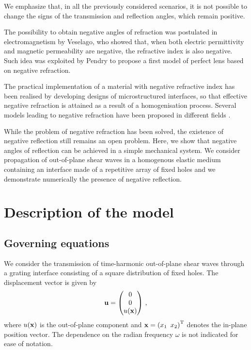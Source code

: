 \documentclass[10p]{article}
\begin{document}
We emphasize that, in all the previously considered scenarios, it is not possible to change the signs of the transmission and reflection angles, which remain positive.  

The possibility to obtain negative angles of refraction was postulated in electromagnetism by Veselago\cite{Veselago1968}, who showed that, when both electric permittivity and magnetic permeability are negative, the refractive index is also negative. Such idea was exploited by Pendry\cite{Pendry2000} to propose a first model of perfect lens based on negative refraction. 

The practical implementation of a material with negative refractive index has been realised by developing designs of microstructured interfaces, so that effective negative refraction is attained as a result of a homogenisation process\cite{Smith2000}. Several models leading to negative refraction have been proposed in different fields \cite{Bigoni2013,Colquitt2011,Farhat2008,HladkyHennion2008,Borfiga2019,Morini2019,Chen2022}.


While the problem of negative refraction has been solved, the existence of negative reflection still remains an open problem.
Here, we show that negative angles of reflection can be achieved in a simple mechanical system. We consider propagation of out-of-plane shear waves in a homogenous elastic medium containing an interface made of a repetitive array of fixed holes and we demonstrate numerically the presence of negative reflection.



\section{\label{Sect1}Description of the model}

\subsection{Governing equations}
\label{Sect1.1}

We consider the transmission of time-harmonic out-of-plane shear waves through a grating interface consisting of a square distribution of fixed holes. The displacement vector is given by
\begin{equation}
\label{eqn001}
{\bf u}=
\begin{pmatrix}
0\\
0\\
u({\bf x})
\end{pmatrix}\,,
\end{equation}
where $u({\bf x})$ is the out-of-plane component and ${\bf x}={(x_1\,\,\, x_2)}^{\textup T}$ denotes the in-plane position vector. The dependence on the radian frequency $\omega$ is not indicated for ease of notation. 
\end{document}
